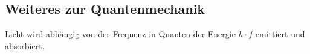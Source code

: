 \documentclass[german]{latex4ei/latex4ei_sheet}
\begin{document}
\begin{sectionbox}
\subsection{Weiteres zur Quantenmechanik}
Licht wird abhängig von der Frequenz in Quanten der Energie $h\cdot f$ emittiert und absorbiert.
\end{sectionbox}
\end{document}
